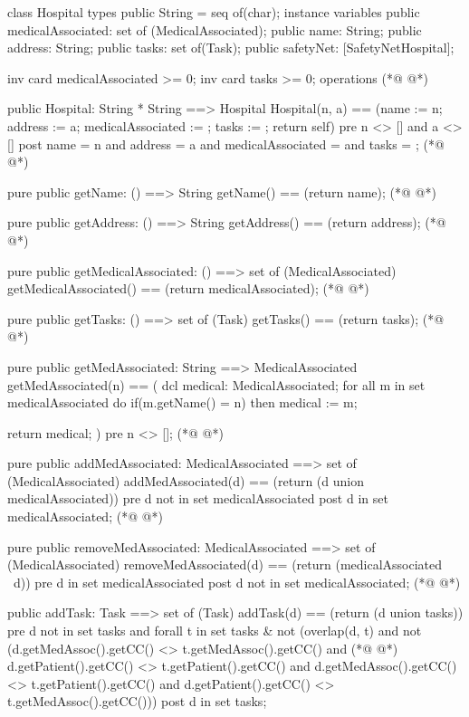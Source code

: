 \begin{vdmpp}[breaklines=true]
class Hospital
types
 public String = seq of(char);
instance variables
  public medicalAssociated: set of (MedicalAssociated);
  public name: String;
  public address: String;
  public tasks: set of(Task);
  public safetyNet: [SafetyNetHospital];
 
 inv card medicalAssociated >= 0;
 inv card tasks >= 0;
operations
(*@
\label{Hospital:14}
@*)

 public Hospital: String * String ==> Hospital
  Hospital(n, a) == (name := n; address := a; medicalAssociated := {}; tasks := {}; return self)
 pre n <> [] and a <> []
 post name = n and address = a and medicalAssociated = {} and tasks = {};
(*@
\label{getName:19}
@*)
 
 pure public getName: () ==> String
  getName() == (return name);
(*@
\label{getAddress:22}
@*)
 
 pure public getAddress: () ==> String
  getAddress() == (return address);
(*@
\label{getMedicalAssociated:25}
@*)
  
 pure public getMedicalAssociated: () ==> set of (MedicalAssociated)
  getMedicalAssociated() == (return medicalAssociated);
(*@
\label{getTasks:28}
@*)
  
 pure public getTasks: () ==> set of (Task)
  getTasks() == (return tasks);
(*@
\label{getMedAssociated:31}
@*)
 
 pure public getMedAssociated: String ==> MedicalAssociated
  getMedAssociated(n) == (
                   dcl medical: MedicalAssociated;
                   for all m in set medicalAssociated do
                    if(m.getName() = n)
                     then medical := m;
                     
                   return medical;
                 )
 pre n <> [];
(*@
\label{addMedAssociated:42}
@*)
 
 pure public addMedAssociated: MedicalAssociated ==> set of (MedicalAssociated)
  addMedAssociated(d) == (return ({d} union medicalAssociated))
 pre d not in set medicalAssociated
 post d in set medicalAssociated;
(*@
\label{removeMedAssociated:47}
@*)
  
 pure public removeMedAssociated: MedicalAssociated ==> set of (MedicalAssociated)
  removeMedAssociated(d) == (return (medicalAssociated \ {d}))
 pre d in set medicalAssociated
 post d not in set medicalAssociated;
(*@
\label{addTask:52}
@*)
 
 public addTask: Task ==> set of (Task)
  addTask(d) == (return ({d} union tasks))
 pre d not in set tasks and forall t in set tasks & 
  not (overlap(d, t) and not (d.getMedAssoc().getCC() <> t.getMedAssoc().getCC() and 
(*@
\label{removeTask:57}
@*)
    d.getPatient().getCC() <> t.getPatient().getCC() and d.getMedAssoc().getCC() <> t.getPatient().getCC()
    and d.getPatient().getCC() <> t.getMedAssoc().getCC()))
 post d in set tasks;
  

\end{vdmpp}
